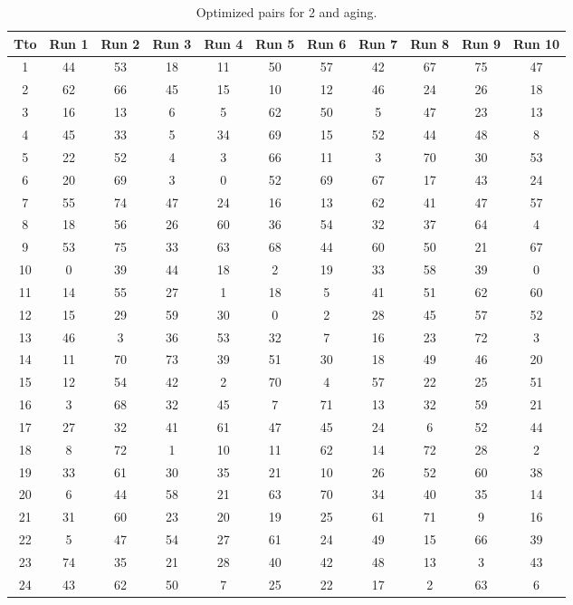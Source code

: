 \begin{table}
  \centering
  \scriptsize
  \caption{Optimized pairs for 2 and aging.}
  \label{tab_pairs}
\begin{tabular}{c c c c c c c c c c c }
\hline
Tto & Run 1 & Run 2 & Run 3 & Run 4 & Run 5 & Run 6 & Run 7 & Run 8 & Run 9 & Run 10 \\
\hline
1 & 44 & 53 & 18 & 11 & 50 & 57 & 42 & 67 & 75 & 47 \\
2 & 62 & 66 & 45 & 15 & 10 & 12 & 46 & 24 & 26 & 18 \\
3 & 16 & 13 & 6 & 5 & 62 & 50 & 5 & 47 & 23 & 13 \\
4 & 45 & 33 & 5 & 34 & 69 & 15 & 52 & 44 & 48 & 8 \\
5 & 22 & 52 & 4 & 3 & 66 & 11 & 3 & 70 & 30 & 53 \\
6 & 20 & 69 & 3 & 0 & 52 & 69 & 67 & 17 & 43 & 24 \\
7 & 55 & 74 & 47 & 24 & 16 & 13 & 62 & 41 & 47 & 57 \\
8 & 18 & 56 & 26 & 60 & 36 & 54 & 32 & 37 & 64 & 4 \\
9 & 53 & 75 & 33 & 63 & 68 & 44 & 60 & 50 & 21 & 67 \\
10 & 0 & 39 & 44 & 18 & 2 & 19 & 33 & 58 & 39 & 0 \\
11 & 14 & 55 & 27 & 1 & 18 & 5 & 41 & 51 & 62 & 60 \\
12 & 15 & 29 & 59 & 30 & 0 & 2 & 28 & 45 & 57 & 52 \\
13 & 46 & 3 & 36 & 53 & 32 & 7 & 16 & 23 & 72 & 3 \\
14 & 11 & 70 & 73 & 39 & 51 & 30 & 18 & 49 & 46 & 20 \\
15 & 12 & 54 & 42 & 2 & 70 & 4 & 57 & 22 & 25 & 51 \\
16 & 3 & 68 & 32 & 45 & 7 & 71 & 13 & 32 & 59 & 21 \\
17 & 27 & 32 & 41 & 61 & 47 & 45 & 24 & 6 & 52 & 44 \\
18 & 8 & 72 & 1 & 10 & 11 & 62 & 14 & 72 & 28 & 2 \\
19 & 33 & 61 & 30 & 35 & 21 & 10 & 26 & 52 & 60 & 38 \\
20 & 6 & 44 & 58 & 21 & 63 & 70 & 34 & 40 & 35 & 14 \\
21 & 31 & 60 & 23 & 20 & 19 & 25 & 61 & 71 & 9 & 16 \\
22 & 5 & 47 & 54 & 27 & 61 & 24 & 49 & 15 & 66 & 39 \\
23 & 74 & 35 & 21 & 28 & 40 & 42 & 48 & 13 & 3 & 43 \\
24 & 43 & 62 & 50 & 7 & 25 & 22 & 17 & 2 & 63 & 6 \\

\end{tabular}
\end{table}
